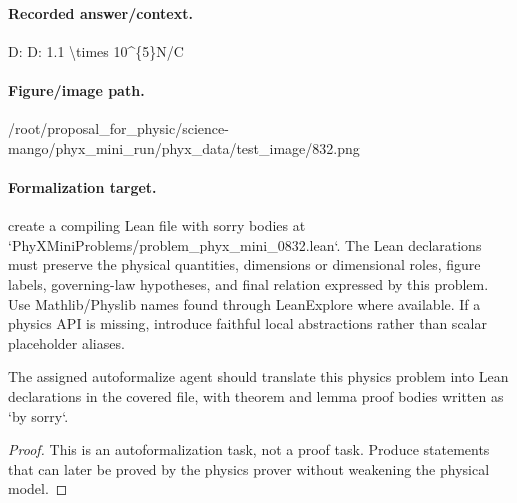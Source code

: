 \paragraph{Recorded answer/context.}
D: D: 1.1 \textbackslash{}times 10\textasciicircum{}\{5\}N/C

\paragraph{Figure/image path.}
/root/proposal\_for\_physic/science-mango/phyx\_mini\_run/phyx\_data/test\_image/832.png

\paragraph{Formalization target.}
create a compiling Lean file with sorry bodies at `PhyXMiniProblems/problem\_phyx\_mini\_0832.lean`. The Lean declarations must preserve the physical quantities, dimensions or dimensional roles, figure labels, governing-law hypotheses, and final relation expressed by this problem.
Use Mathlib/Physlib names found through LeanExplore where available. If a physics API is missing, introduce faithful local abstractions rather than scalar placeholder aliases.

\begin{theorem}
\label{thm:physics:phyx_mini_0832:target}
The assigned autoformalize agent should translate this physics problem into Lean declarations in the covered file, with theorem and lemma proof bodies written as `by sorry`.
\end{theorem}
\begin{proof}
This is an autoformalization task, not a proof task. Produce statements that can later be proved by the physics prover without weakening the physical model.
\end{proof}

